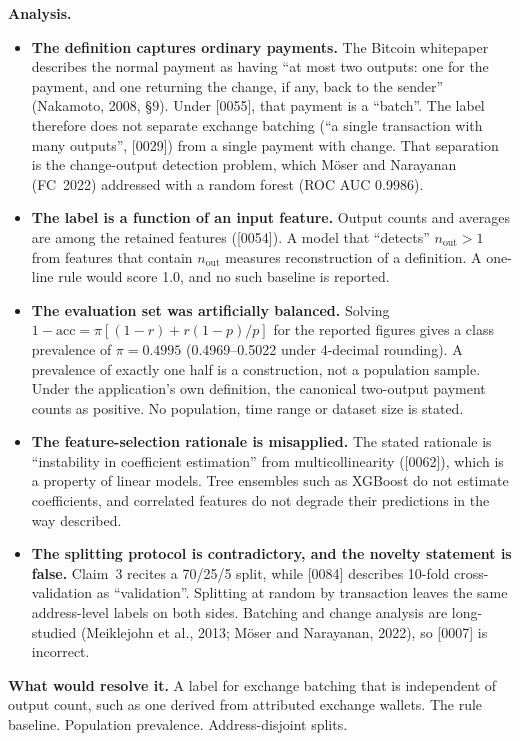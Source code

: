 \documentclass[10pt,a4paper]{article}
\newcommand{\req}[1]{\noindent\textbf{What would resolve it.} #1\par}
\begin{document}
\noindent\textbf{Analysis.}
\begin{itemize}
  \item \textbf{The definition captures ordinary payments.} The Bitcoin whitepaper describes the normal payment as having ``at most two outputs: one for the payment, and one returning the change, if any, back to the sender'' (Nakamoto, 2008, \S9). Under [0055], that payment is a ``batch''. The label therefore does not separate exchange batching (``a single transaction with many outputs'', [0029]) from a single payment with change. That separation is the change-output detection problem, which M\"oser and Narayanan (FC~2022) addressed with a random forest (ROC AUC 0.9986).
  \item \textbf{The label is a function of an input feature.} Output counts and averages are among the retained features ([0054]). A model that ``detects'' $n_\mathrm{out}>1$ from features that contain $n_\mathrm{out}$ measures reconstruction of a definition. A one-line rule would score 1.0, and no such baseline is reported.
  \item \textbf{The evaluation set was artificially balanced.} Solving $1-\mathrm{acc}=\pi[(1-r)+r(1-p)/p]$ for the reported figures gives a class prevalence of $\pi=0.4995$ (0.4969--0.5022 under 4-decimal rounding). A prevalence of exactly one half is a construction, not a population sample. Under the application's own definition, the canonical two-output payment counts as positive. No population, time range or dataset size is stated.
  \item \textbf{The feature-selection rationale is misapplied.} The stated rationale is ``instability in coefficient estimation'' from multicollinearity ([0062]), which is a property of linear models. Tree ensembles such as XGBoost do not estimate coefficients, and correlated features do not degrade their predictions in the way described.
  \item \textbf{The splitting protocol is contradictory, and the novelty statement is false.} Claim~3 recites a 70/25/5 split, while [0084] describes 10-fold cross-validation as ``validation''. Splitting at random by transaction leaves the same address-level labels on both sides. Batching and change analysis are long-studied (Meiklejohn et al., 2013; M\"oser and Narayanan, 2022), so [0007] is incorrect.
\end{itemize}
\req{A label for exchange batching that is independent of output count, such as one derived from attributed exchange wallets. The rule baseline. Population prevalence. Address-disjoint splits.}
\end{document}
